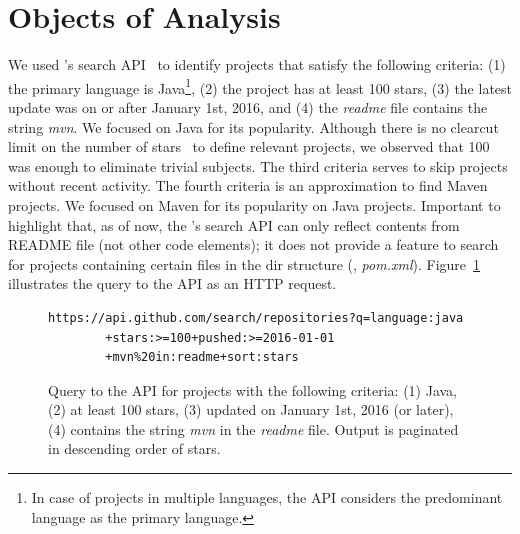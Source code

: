 \section{Objects of Analysis}
\label{sec:subjects}



We used \github{}'s search API~\cite{githubsearch} to identify
projects that satisfy the following criteria: (1) the primary language
is Java\footnote{In case of projects in multiple languages, the
  \github{} API considers the predominant language as the primary
  language.}, (2) the project has at least 100 stars, (3) the latest
update was on or after January 1st, 2016, and (4) the \emph{readme}
file contains the string \emph{mvn}.  We focused on Java for its
popularity.  Although there is no clearcut limit on the number of
\github{} stars~\cite{github-stars} to define relevant projects, we
observed that 100 was enough to eliminate trivial subjects. The third
criteria serves to skip projects without recent activity. The fourth
criteria is an approximation to find Maven projects. We focused on Maven for its popularity on
Java projects.  Important to highlight that, as of now, the
\github{}'s search API can only reflect contents from README file (not
other code elements); it does not provide a feature to search for
projects containing certain files in the dir structure (\eg{},
\emph{pom.xml}).  Figure~\ref{fig:subject-query} illustrates the query
to the \github{} API as an HTTP request.  

\vspace{1ex}
\begin{figure}[h!]
\centering
\scriptsize
{}
\begin{lstlisting}
https://api.github.com/search/repositories?q=language:java
        +stars:>=100+pushed:>=2016-01-01
        +mvn%20in:readme+sort:stars
\end{lstlisting}
    \caption{\label{fig:subject-query} Query to the \github{} API for
    projects with the following criteria: (1) Java, (2) at least 100
    stars, (3) updated on January 1st, 2016 (or later), (4) contains
    the string \emph{mvn} in the \emph{readme} file. Output is
    paginated in descending order of stars.}
\end{figure}

